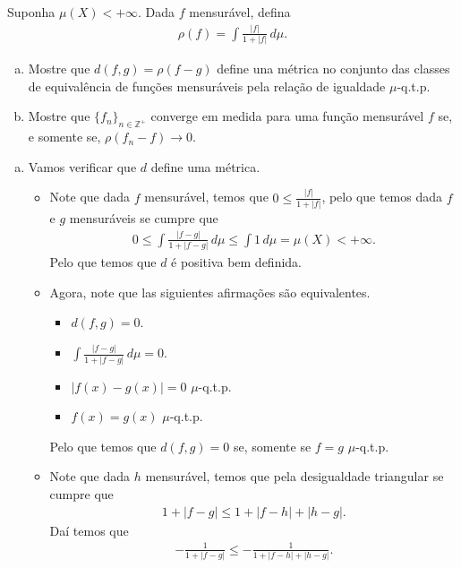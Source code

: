 \begin{homeworkProblem}[7]
  Suponha $\mu(X)<+\infty$. Dada $f$ mensurável, defina
  \begin{align*}
    \rho(f)=\int \frac{|f|}{1+|f|}\,d\mu.
  \end{align*}
  \begin{enumerate}[a)]
    \item Mostre que $d(f,g)=\rho(f-g)$ define una métrica no conjunto das classes de equivalência de funções mensuráveis pela relação de igualdade $\mu$-q.t.p. 
    \item Mostre que $\{f_n\}_{n\in\mathbb{Z}^{+}}$ converge em medida para uma função mensurável $f$ se, e somente se, $\rho(f_n-f)\to 0$. 
  \end{enumerate}
  \begin{solution}
    \begin{enumerate}[a)]
    \item Vamos verificar que $d$ define uma métrica.\\
    \begin{itemize}
      \item Note que dada $f$ mensurável, temos que $0\leq \frac{|f|}{1+|f|}$, pelo que temos dada $f$ e $g$ mensuráveis se cumpre que
        \begin{align*}
          0\leq \int \frac{|f-g|}{1+|f-g|}\,d\mu \leq \int 1\,d\mu =\mu(X)<+\infty.
        \end{align*}
        Pelo que temos que $d$ é positiva bem definida.
      \item Agora, note que las siguientes afirmações são equivalentes.
        \begin{itemize}
          \item $d(f,g)=0$.
          \item $\int \frac{|f-g|}{1+|f-g|}\,d\mu=0$.
          \item $|f(x)-g(x)|=0$ $\mu$-q.t.p.
          \item $f(x)=g(x)$ $\mu$-q.t.p. 
        \end{itemize}
        Pelo que temos que $d(f,g)=0$ se, somente se $f=g$ $\mu$-q.t.p.
      \item Note que dada $h$ mensurável, temos que pela desigualdade triangular se cumpre que
        \begin{align*}
          1+|f-g|\leq 1+|f-h|+|h-g|.
        \end{align*}
        Daí temos que
        \begin{align*}
          -\frac{1}{1+|f-g|}\leq -\frac{1}{1+|f-h|+|h-g|}.

\end{align*}
\end{itemize}
\end{enumerate}
\end{solution}
\end{homeworkProblem}
